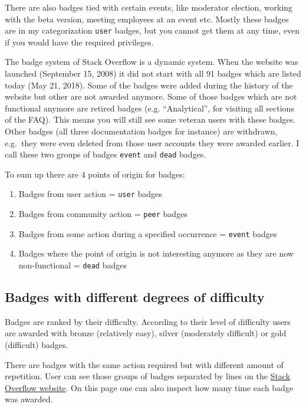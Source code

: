 \documentclass[]{book}
\providecommand{\tightlist}{%
  \setlength{\itemsep}{0pt}\setlength{\parskip}{0pt}}
\theoremstyle{definition}
\theoremstyle{definition}
\theoremstyle{definition}
\theoremstyle{remark}
\begin{document}
There are also badges tied with certain events, like moderator election,
working with the beta version, meeting employees at an event etc. Mostly
these badges are in my categorization \texttt{user} badges, but you
cannot get them at any time, even if you would have the required
privileges.

The badge system of Stack Overflow is a dynamic system. When the website
was launched (September 15, 2008) it did not start with all 91 badges
which are listed today (May 21, 2018). Some of the badges were added
during the history of the website but other are not awarded anymore.
Some of those badges which are not functional anymore are retired badges
(e.g. ``Analytical'', for visiting all sections of the FAQ). This means
you will still see some veteran users with these badges. Other badges
(all three documentation badges for instance) are withdrawn, e.g.~they
were even deleted from those user accounts they were awarded earlier. I
call these two groups of badges \texttt{event} and \texttt{dead} badges.

To sum up there are 4 points of origin for badges:

\begin{enumerate}
\def\labelenumi{\arabic{enumi})}
\tightlist
\item
  Badges from user action = \texttt{user} badges
\item
  Badges from community action = \texttt{peer} badges
\item
  Badges from some action during a specified occurrence = \texttt{event}
  badges
\item
  Badges where the point of origin is not interesting anymore as they
  are now non-functional = \texttt{dead} badges
\end{enumerate}

\subsection{Badges with different degrees of
difficulty}\label{badges-with-different-degrees-of-difficulty}

Badges are ranked by their difficulty. According to their level of
difficulty users are awarded with bronze (relatively easy), silver
(moderately difficult) or gold (difficult) badges.

There are badges with the same action required but with different amount
of repetition. User can see those groups of badges separated by lines on
the \href{https://stackoverflow.com/help/badges}{Stack Overflow
website}. On this page one can also inspect how many time each badge was
awarded.
\end{document}
